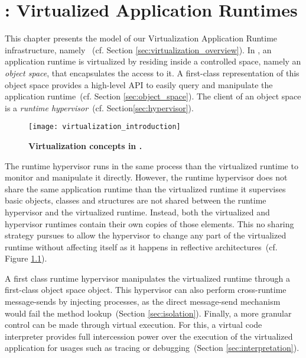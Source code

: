 

\chapter{\VTT: Virtualized Application Runtimes}
\minitoc
\introduction

This chapter presents the model of our Virtualization Application Runtime infrastructure, namely \VTT~(cf. Section \ref{sec:virtualization_overview}). In \VTT, an application runtime is virtualized by residing inside a controlled space, namely an \emph{object space}, that encapsulates the access to it. A first-class representation of this object space provides a high-level API to easily query and manipulate the application runtime~(cf. Section \ref{sec:object_space}). The client of an object space is a \emph{runtime hypervisor}~(cf. Section\ref{sec:hypervisor}).

\begin{figure}[htb]
\begin{center}
\texttt{[image: virtualization\_introduction]}
\caption{\textbf{Virtualization concepts in \Vtt.}\label{fig:virtualization_introduction}}
\end{center}
\end{figure}

The runtime hypervisor runs in the same process than the virtualized runtime to monitor and manipulate it directly. However, the runtime hypervisor does not share the same application runtime than the virtualized runtime it supervises \ie basic objects, classes and \VM structures are not shared between the runtime hypervisor and the virtualized runtime. Instead, both the virtualized and hypervisor runtimes contain their own copies of those elements. This no sharing strategy pursues to allow the hypervisor to change any part of the virtualized runtime without affecting itself as it happens in reflective architectures~(cf. Figure \ref{fig:virtualization_introduction}).

A first class runtime hypervisor manipulates the virtualized runtime through a first-class object space object. This hypervisor can also perform cross-runtime message-sends by injecting processes, as the direct message-send \VM mechanism would fail the method lookup~(Section \ref{sec:isolation}).
Finally, a more granular control can be made through virtual execution. For this, a virtual code interpreter provides full intercession power over the execution of the virtualized application for usages such as tracing or debugging~(Section \ref{sec:interpretation}).

